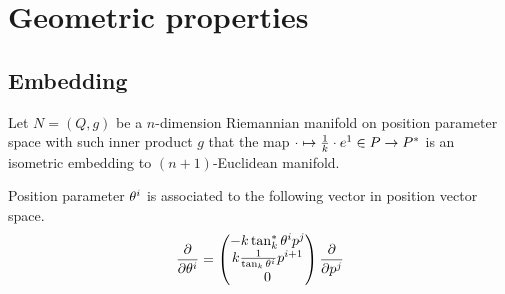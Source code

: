 \documentclass[../main.tex]{subfiles}
\begin{document}
\section{Geometric properties}
\subsection{Embedding}
\begin{definition}\label{M:Embedding}
    Let $N=\left(Q,g\right)$ be a $n$-dimension Riemannian manifold
    on position parameter space with such inner product $g$ that
    the map $\cdot\mapsto\frac{1}{k}\cdot\tensor{e}{^1}\in P\to P^\ast$ is an isometric embedding to $\left(n+1\right)$-Euclidean manifold.
\end{definition}
\begin{lemma}\label{M:Tangent:Basis}
    Position parameter $\tensor{\theta}{^i}$ is associated to the following vector in position vector space.
    \begin{equation*}
        \frac{\partial}{\partial\tensor{\theta}{^i}} =
        \begin{pmatrix}
            -k\tan_k^\ast\tensor{\theta}{^i}\tensor{p}{^j}         \\
            k\frac{1}{\tan_k\tensor{\theta}{^i}}\tensor{p}{^{i+1}} \\
            0
        \end{pmatrix} \frac{\partial}{\partial\tensor{p}{^j}}
    \end{equation*}
\end{lemma}
\end{document}

